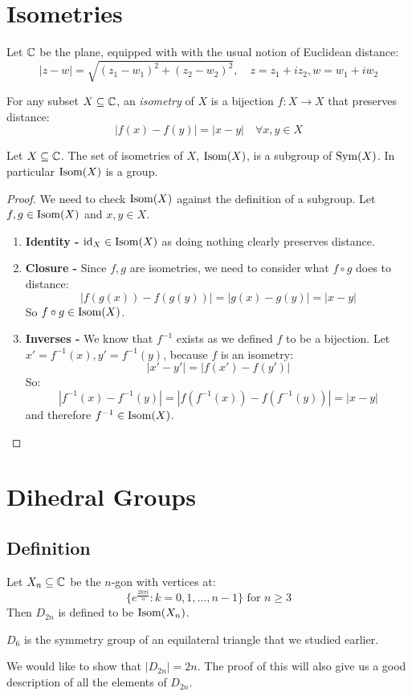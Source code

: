 \documentclass[../main.tex]{subfiles}
\begin{document}
\section{Isometries}
Let $\mathbb{C}$ be the plane, equipped with with the usual notion of Euclidean distance:
\[
   |z-w| = \sqrt{(z_1 - w_1)^2 + (z_2 - w_2)^2}, \quad z = z_1 + i z_2, w = w_1 + i w_2
\]
\begin{definition}[Isometry]
  For any subset $X \subseteq \mathbb{C}$, an \textit{isometry} of $X$ is a bijection $f: X \to X$ that preserves distance:
  \[
    |f(x) - f(y)| = |x - y| \quad \forall x, y \in X
  \]
\end{definition}
\begin{proposition}
  Let $X \subseteq \mathbb{C}$.
  The set of isometries of $X$, $\operatorname{Isom}(X)$, is a subgroup of $\operatorname{Sym}(X)$.
  In particular $\operatorname{Isom}(X)$ is a group.
\end{proposition}
\begin{proof}
  We need to check $\operatorname{Isom}(X)$ against  the definition of a subgroup.
  Let $f, g \in \operatorname{Isom}(X)$ and $x, y \in X$.
  \begin{enumerate}
    \item \textbf{Identity -} $\mathrm{id}_X \in \operatorname{Isom}(X)$ as doing nothing clearly preserves distance.
    \item \textbf{Closure -} Since $f, g$ are isometries, we need to consider what $f \circ g$ does to distance:
      \[
        |f(g(x)) - f(g(y))| = |g(x) - g(y)| = |x - y|
      \]
      So $f \circ g \in \operatorname{Isom}(X)$.
    \item \textbf{Inverses -} We know that $f^{-1}$ exists as we defined $f$ to be a bijection.
      Let $x' = f^{-1}(x), y' = f^{-1}(y)$, because $f$ is an isometry:
      \[
        |x' - y'| = |f(x') - f(y')|
      \]
      So:
      \[
        |f^{-1}(x) - f^{-1}(y)| = |f(f^{-1}(x)) - f(f^{-1}(y))| = |x - y|
      \]
      and therefore $f^{-1} \in \operatorname{Isom}(X)$.
  \end{enumerate}
\end{proof}
\section{Dihedral Groups}
\subsection{Definition}
\begin{definition}
  Let $X_n \subseteq \mathbb{C}$ be the $n$-gon with vertices at:
  \[
    \{e^{\frac{2k\pi i}{n}}: k = 0, 1, \ldots, n-1\} \text{ for } n \geq3
  \]
  Then $D_{2n}$ is defined to be $\operatorname{Isom}(X_n)$.
\end{definition}
\begin{example}
  $D_6$ is the symmetry group of an equilateral triangle that we studied earlier.
\end{example}
We would like to show that $|D_{2n}| = 2n$.
The proof of this will also give us a good description of all the elements of $D_{2n}$.
\end{document}
